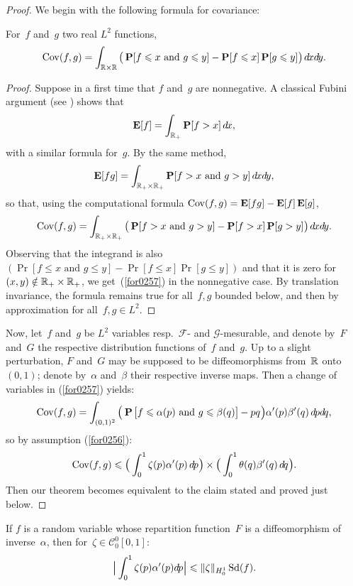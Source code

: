 \begin{proof}
We begin with the following formula for covariance:
\begin{Lem}\label{lem8312}
For~$f$ and~$g$ two real $L^2$ functions,
\[\label{for0257}
\Cov(f,g) = \int_{\RR\times\RR}
\big( \Pr[f\leq x\text{ and }g\leq y] - \Pr[f\leq x] \Pr[g\leq y]\big) \,\dx{x}\dx{y} .\]
\end{Lem}
%
\begingroup{}
\begin{proof}
Suppose in a first time that $f$ and~$g$ are nonnegative.
A classical Fubini argument (see \cite[Problem~21.6]{Billingsley*})
shows that
\[ \EE[f] = \int_{\RR_+} \Pr[f>x] \,\dx{x} ,\]
with a similar formula for~$g$. By the same method,
\[ \EE[fg] = \int_{\RR_+\times\RR_+} \Pr[f>x \text{ and } g>y] \,\dx{x}\dx{y} ,\]
so that, using the computational formula $\operatorname{Cov}(f,g) = \mathop{\smash{\mathbf{E}}}\nolimits[fg] - \mathop{\smash{\mathbf{E}}}\nolimits[f]\mathop{\smash{\mathbf{E}}}\nolimits[g]$,
\[ \Cov(f,g) = \int_{\RR_+\times\RR_+}
\big( \Pr[f>x\text{ and }g>y] - \Pr[f>x] \Pr[g>y] \big) \,\dx{x}\dx{y}.\]
Observing that the integrand is also
$( \Pr[f\leq x\text{ and }g\leq y] - \Pr[f\leq x] \Pr[g\leq y] )$
and that it is zero for~$(x,y) \notin \mathbb{R}_+ \times \mathbb{R}_+$,
we get~(\ref{for0257}) in the nonnegative case.
By translation invariance, the formula remains true for all~$f,g$ bounded below,
and then by approximation for all~$f,g \in L^2$.
\end{proof}\endgroup

Now, let~$f$ and~$g$ be $L^2$ variables resp.\ $\mathcal{F}$- and $\mathcal{G}$-mesurable,
and denote by~$F$ and~$G$ the respective distribution functions of~$f$ and~$g$.
Up to a slight perturbation, $F$ and~$G$
may be supposed to be diffeomorphisms from~$\mathbb{R}$ onto~$(0,1)$;
denote by~$\alpha$ and~$\beta$ their respective inverse maps.
Then a change of variables in (\ref{for0257}) yields:
\[\label{for0268} \Cov(f,g) = \int_{(0,1)^2}
\Big( \Pr\big[f\leq \alpha(p)\text{ and }g\leq \beta(q)\big] - pq \Big)
\alpha'(p)\beta'(q) \,\dx{p}\dx{q} ,\]
so by assumption (\ref{for0256}):
\[\label{for9181}
\Cov(f,g) \leq \Big(\int_0^1\zeta(p)\alpha'(p) \,\dx{p}\Big) \times
\Big(\int_0^1\theta(q)\beta'(q) \,\dx{q}\Big) .\]
Then our theorem becomes equivalent to the claim stated and proved just below.
\end{proof}
%
\begin{Clm}\label{clm6860}
If $f$ is a random variable whose repartition function~$F$ is a diffeomorphism
of inverse~$\alpha$, then for~$\zeta \in \mathcal{C}^0_0[0,1]$:
\[ \Big| \int_0^1 \zeta(p)\alpha'(p)\dx{p} \Big| \leq \|\zeta\|_{H^1_0} \ecty(f) .\]
\end{Clm}

